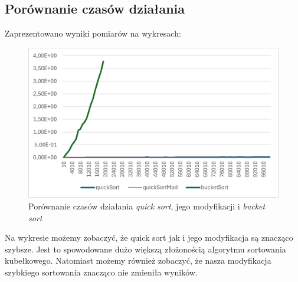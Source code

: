 \documentclass{article}
\begin{document}
	\subsection{Porównanie czasów działania}
	Zaprezentowano wyniki pomiarów na wykresach:
	
	\begin{figure}[H]
		\centering
		\includegraphics[width=\textwidth]{algorytmy.png}
		\caption{Porównanie czasów działania \textit{quick sort}, jego modyfikacji i \textit{bucket sort}}
	\end{figure}
	Na wykresie możemy zobaczyć, że quick sort jak i jego modyfikacja są znacząco szybsze. Jest to spowodowane dużo większą złożonością algorytmu sortowania kubełkowego. Natomiast możemy również zobaczyć, że nasza modyfikacja szybkiego sortowania znacząco nie zmieniła wyników. 
	
\end{document}
